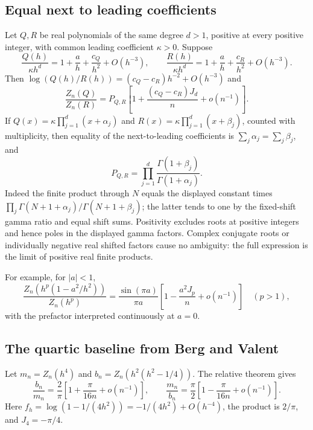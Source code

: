 \documentclass[11pt,letterpaper]{article}
\numberwithin{equation}{section}
\theoremstyle{remark}\newtheorem{remark}[theorem]{Remark}
\begin{document}
\subsection{Equal next to leading coefficients}
Let $Q,R$ be real polynomials of the same degree $d>1$, positive at every positive integer, with common leading coefficient $\kappa>0$. Suppose
\[
 \frac{Q(h)}{\kappa h^d}=1+\frac a h+\frac{c_Q}{h^2}+O(h^{-3}),\qquad
 \frac{R(h)}{\kappa h^d}=1+\frac a h+\frac{c_R}{h^2}+O(h^{-3}).
\]
Then $\log(Q(h)/R(h))=(c_Q-c_R)h^{-2}+O(h^{-3})$ and
\begin{equation}\label{pwd:rc:eq:poly-relative}
 \frac{Z_n(Q)}{Z_n(R)}=P_{Q,R}
 \left[1+\frac{(c_Q-c_R)J_d}{n}+o(n^{-1})\right].
\end{equation}
If
$Q(x)=\kappa\prod_{j=1}^d(x+\alpha_j)$ and
$R(x)=\kappa\prod_{j=1}^d(x+\beta_j)$, counted with multiplicity, then equality of the next-to-leading coefficients is $\sum_j\alpha_j=\sum_j\beta_j$, and
\begin{equation}\label{pwd:rc:eq:gamma-product}
 P_{Q,R}=\prod_{j=1}^d\frac{\Gamma(1+\beta_j)}{\Gamma(1+\alpha_j)}.
\end{equation}
Indeed the finite product through $N$ equals the displayed constant times
$\prod_j\Gamma(N+1+\alpha_j)/\Gamma(N+1+\beta_j)$; the latter tends to one by the fixed-shift gamma ratio and equal shift sums. Positivity excludes roots at positive integers and hence poles in the displayed gamma factors. Complex conjugate roots or individually negative real shifted factors cause no ambiguity: the full expression is the limit of positive real finite products.

For example, for $|a|<1$,
\[
 \frac{Z_n(h^p(1-a^2/h^2))}{Z_n(h^p)}
 =\frac{\sin(\pi a)}{\pi a}
 \left[1-\frac{a^2J_p}{n}+o(n^{-1})\right]\quad(p>1),
\]
with the prefactor interpreted continuously at $a=0$.

\subsection{The quartic baseline from Berg and Valent}\label{pwd:rc:sec:quartic-proof}
Let $m_n=Z_n(h^4)$ and $b_n=Z_n(h^2(h^2-1/4))$. The relative theorem gives
\begin{equation}\label{pwd:rc:eq:quartic-comparison}
 \frac{b_n}{m_n}=\frac2\pi\left[1+\frac\pi{16n}+o(n^{-1})\right],
 \qquad
 \frac{m_n}{b_n}=\frac\pi2\left[1-\frac\pi{16n}+o(n^{-1})\right].
\end{equation}
Here $f_h=\log(1-1/(4h^2))=-1/(4h^2)+O(h^{-4})$, the product is $2/\pi$, and $J_4=-\pi/4$.
\end{document}
